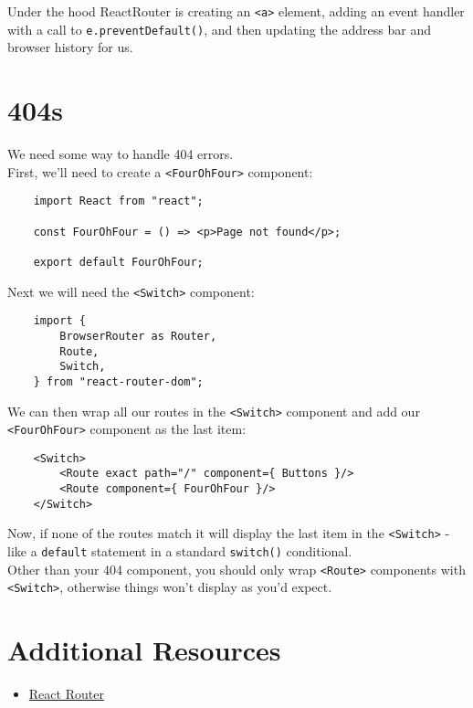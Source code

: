 Under the hood ReactRouter is creating an \texttt{<a>} element, adding an event handler with a call to \texttt{e.preventDefault()}, and then updating the address bar and browser history for us.



\section{404s}


We need some way to handle 404 errors.
\\

First, we'll need to create a \texttt{<FourOhFour>} component:

\begin{verbatim}
    import React from "react";

    const FourOhFour = () => <p>Page not found</p>;

    export default FourOhFour;
\end{verbatim}


Next we will need the \texttt{<Switch>} component:

\begin{verbatim}
    import {
        BrowserRouter as Router,
        Route,
        Switch,
    } from "react-router-dom";
\end{verbatim}

We can then wrap all our routes in the \texttt{<Switch>} component and add our \texttt{<FourOhFour>} component as the last item:

\begin{verbatim}
    <Switch>
        <Route exact path="/" component={ Buttons }/>
        <Route component={ FourOhFour }/>
    </Switch>
\end{verbatim}

Now, if none of the routes match it will display the last item in the \texttt{<Switch>} - like a \texttt{default} statement in a standard \texttt{switch()} conditional.
\\

Other than your 404 component, you should only wrap \texttt{<Route>} components with \texttt{<Switch>}, otherwise things won't display as you'd expect.



\section{Additional Resources}

\begin{itemize}[leftmargin=*]
    \item \href{https://reacttraining.com/react-router/web/guides/philosophy}{React Router}
\end{itemize}
